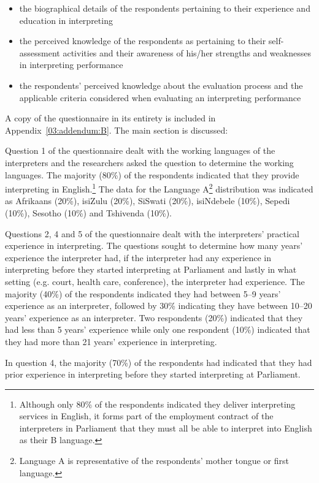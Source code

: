 \documentclass[output=paper]{langsci/langscibook}
\begin{document}
\begin{itemize}
\item the biographical details of the respondents pertaining to their experience and education in interpreting
\item the perceived knowledge of the respondents as pertaining to their self-assessment activities and their awareness of his/her strengths and weaknesses in interpreting performance
\item the respondents’ perceived knowledge about the evaluation process and the applicable criteria considered when evaluating an interpreting performance \end{itemize}

A copy of the questionnaire in its entirety is included in Appendix~\ref{03:addendum:B}.
The main section is discussed:

Question 1 of the questionnaire dealt with the working languages of the interpreters and the researchers asked the question to determine the working languages. The majority (80\%) of the respondents indicated that they provide interpreting in English.\footnote{Although only 80\% of the respondents indicated they deliver interpreting services in English, it forms part of the employment contract of the interpreters in Parliament that they must all be able to interpret into English as their B language.} The data for the Language A\footnote{Language A is representative of the respondents’ mother tongue or first language.}  distribution was indicated as Afrikaans (20\%), isiZulu (20\%), SiSwati (20\%), isiNdebele (10\%), Sepedi (10\%), Sesotho (10\%) and Tshivenda (10\%). 

Questions 2, 4 and 5 of the questionnaire dealt with the interpreters’ practical experience in interpreting. The questions sought to determine how many years’ experience the interpreter had, if the interpreter had any experience in interpreting before they started interpreting at Parliament and lastly in what setting (e.g. court, health care, conference), the interpreter had experience. The majority (40\%) of the respondents indicated they had between 5--9 years’ experience as an interpreter, followed by 30\% indicating they have between 10--20 years’ experience as an interpreter. Two respondents (20\%) indicated that they had less than 5 years’ experience while only one respondent (10\%) indicated that they had more than 21 years’ experience in interpreting.  

In question 4, the majority (70\%) of the respondents had indicated that they had prior experience in interpreting before they started interpreting at Parliament.  
\end{document}
